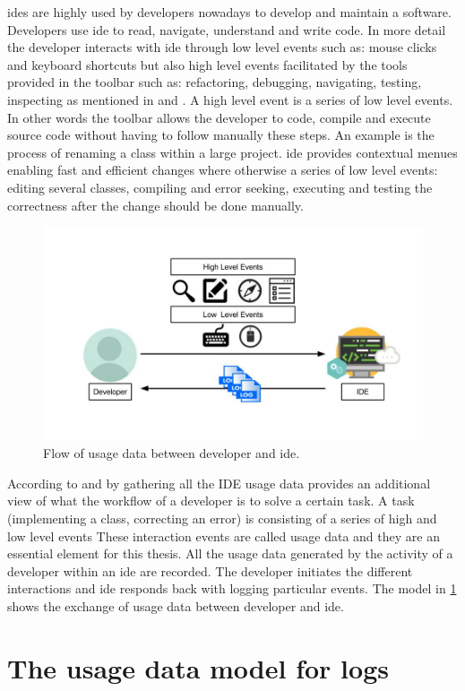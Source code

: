 \gls{ide}s are highly used by developers nowadays to develop and maintain a software. Developers use \gls{ide} to read, navigate, understand and write code. In more detail the developer interacts with \gls{ide} through low level events such as: mouse clicks and keyboard shortcuts but also high level events facilitated by the tools provided in the toolbar such as: refactoring, debugging, navigating, testing, inspecting as mentioned in 
and . 
A high level event is a series of low level events. In other words the toolbar allows the developer to code, compile and execute source code without having to follow manually these steps.  An example is the process of renaming a class within a large project. \gls{ide} provides contextual menues enabling fast and efficient changes where otherwise a series of low level events: editing several classes, compiling and error seeking, executing and testing the correctness after the change should be done manually.

	\begin{figure}[!ht]
		\begin{center}
		 
        \includegraphics[width=\textwidth]{figures/ch1a_dev_ide.jpg}
		\end{center}
		\caption{Flow of usage data between developer and \gls{ide}.}
		\label{fig:ch1a_dev_ide}
	\end{figure}

According to  and  by gathering all the IDE usage data provides an additional view of what the workflow of a developer is to solve a certain task.
A task (implementing a class, correcting an error) is consisting of a series of high and low level events  These interaction events are called usage data  and they are an essential element for this thesis. All the usage data generated by the activity of a developer within an \gls{ide} are recorded. The developer initiates the different interactions and \gls{ide} responds back with logging particular events. The model in \ref{fig:ch1a_dev_ide} shows the exchange of usage data between developer and \gls{ide}.

\section{The usage data model for logs} 
